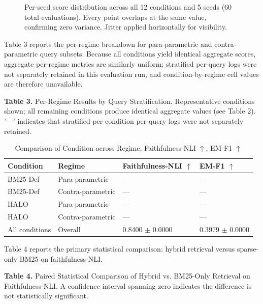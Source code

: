 \documentclass{article}
\begin{document}
\begin{figure}[t]
\centering

\caption{Per-seed score distribution across all 12 conditions and 5 seeds (60 total evaluations). Every point overlaps at the same value, confirming zero variance. Jitter applied horizontally for visibility.}
\label{fig:seed_variance}
\end{figure}

Table 3 reports the per-regime breakdown for para-parametric and contra-parametric query subsets. Because all conditions yield identical aggregate scores, aggregate per-regime metrics are similarly uniform; stratified per-query logs were not separately retained in this evaluation run, and condition-by-regime cell values are therefore unavailable.

\textbf{Table 3.} Per-Regime Results by Query Stratification. Representative conditions shown; all remaining conditions produce identical aggregate values (see Table 2). '---' indicates that stratified per-condition per-query logs were not separately retained.

\begin{table}[ht]
\centering
\begin{tabular}{llll}
\toprule
\textbf{Condition} & \textbf{Regime} & \textbf{Faithfulness-NLI $\uparrow$} & \textbf{EM-F1 $\uparrow$} \\
\midrule
BM25-Def & Para-parametric & --- & --- \\
BM25-Def & Contra-parametric & --- & --- \\
HALO & Para-parametric & --- & --- \\
HALO & Contra-parametric & --- & --- \\
All conditions & Overall & 0.8400 $\pm$ 0.0000 & 0.3979 $\pm$ 0.0000 \\
\bottomrule
\end{tabular}
\caption{Comparison of Condition across Regime, Faithfulness-NLI $\uparrow$, EM-F1 $\uparrow$}
\label{tab:3}
\end{table}

Table 4 reports the primary statistical comparison: hybrid retrieval versus sparse-only BM25 on faithfulness-NLI.

\textbf{Table 4.} Paired Statistical Comparison of Hybrid vs. BM25-Only Retrieval on Faithfulness-NLI. A confidence interval spanning zero indicates the difference is not statistically significant.

\begin{table}[ht]
\centering
{}
\caption{Comparison of Comparison across Mean Diff, Std Diff, CI$_{9}$$_{5}$, Significant?}
\label{tab:4}
\end{table}
\end{document}
